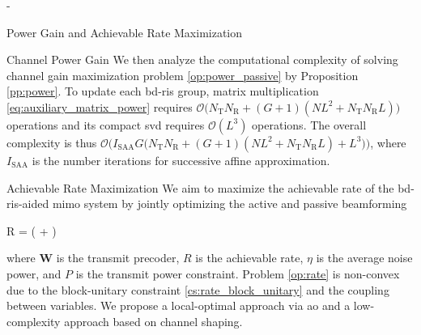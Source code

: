 \begin{section}{-}
\begin{subsection}{Power Gain and Achievable Rate Maximization}
\begin{subsubsection}{Channel Power Gain}
			We then analyze the computational complexity of solving channel gain maximization problem \eqref{op:power_passive} by Proposition \ref{pp:power}.
			To update each \gls{bd}-\gls{ris} group, matrix multiplication \eqref{eq:auxiliary_matrix_power} requires $\mathcal{O}\bigl(N_\mathrm{T} N_\mathrm{R} + (G+1)(NL^2+N_\mathrm{T} N_\mathrm{R} L)\bigr)$ operations and its compact \gls{svd} requires $\mathcal{O}(L^3)$ operations.
			The overall complexity is thus $\mathcal{O}\bigl(I_\text{SAA} G \bigl(N_\mathrm{T} N_\mathrm{R} + (G+1)(NL^2+N_\mathrm{T} N_\mathrm{R} L) + L^3\bigr)\bigr)$, where $I_\text{SAA}$ is the number iterations for successive affine approximation.
		\end{subsubsection}

		\begin{subsubsection}{Achievable Rate Maximization}\label{sc:rate}
			We aim to maximize the achievable rate of the \gls{bd}-\gls{ris}-aided \gls{mimo} system by jointly optimizing the active and passive beamforming
			\begin{maxi!}
				{}{R = \log \det \biggl( + \biggr)}{\label{op:rate}}{\label{ob:rate}}
			\end{maxi!}
			where $\mathbf{W}$ is the transmit precoder, $R$ is the achievable rate, $\eta$ is the average noise power, and $P$ is the transmit power constraint.
			Problem \eqref{op:rate} is non-convex due to the block-unitary constraint \eqref{cs:rate_block_unitary} and the coupling between variables.
			We propose a local-optimal approach via \gls{ao} and a low-complexity approach based on channel shaping.


\end{subsubsection}
\end{subsection}
\end{section}
